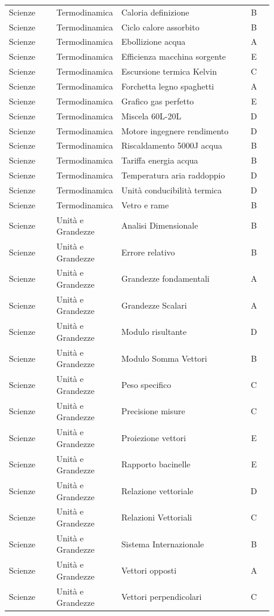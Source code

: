 \documentclass[20pt, a4paper]{article}
\begin{document}
\begin{longtable}{@{}>{\raggedright\arraybackslash}p{0.18\linewidth}>{\raggedright\arraybackslash}p{0.24\linewidth}>{\raggedright\arraybackslash}p{0.46\linewidth}c@{}}
Scienze & Termodinamica & Caloria definizione & B \\
Scienze & Termodinamica & Ciclo calore assorbito & B \\
Scienze & Termodinamica & Ebollizione acqua & A \\
Scienze & Termodinamica & Efficienza macchina sorgente & E \\
Scienze & Termodinamica & Escursione termica Kelvin & C \\
Scienze & Termodinamica & Forchetta legno spaghetti & A \\
Scienze & Termodinamica & Grafico gas perfetto & E \\
Scienze & Termodinamica & Miscela 60L-20L & D \\
Scienze & Termodinamica & Motore ingegnere rendimento & D \\
Scienze & Termodinamica & Riscaldamento 5000J acqua & B \\
Scienze & Termodinamica & Tariffa energia acqua & B \\
Scienze & Termodinamica & Temperatura aria raddoppio & D \\
Scienze & Termodinamica & Unità conducibilità termica & D \\
Scienze & Termodinamica & Vetro e rame & B \\
Scienze & Unità e Grandezze & Analisi Dimensionale & B \\
Scienze & Unità e Grandezze & Errore relativo & B \\
Scienze & Unità e Grandezze & Grandezze fondamentali & A \\
Scienze & Unità e Grandezze & Grandezze Scalari & A \\
Scienze & Unità e Grandezze & Modulo risultante & D \\
Scienze & Unità e Grandezze & Modulo Somma Vettori & B \\
Scienze & Unità e Grandezze & Peso specifico & C \\
Scienze & Unità e Grandezze & Precisione misure & C \\
Scienze & Unità e Grandezze & Proiezione vettori & E \\
Scienze & Unità e Grandezze & Rapporto bacinelle & E \\
Scienze & Unità e Grandezze & Relazione vettoriale & D \\
Scienze & Unità e Grandezze & Relazioni Vettoriali & C \\
Scienze & Unità e Grandezze & Sistema Internazionale & B \\
Scienze & Unità e Grandezze & Vettori opposti & A \\
Scienze & Unità e Grandezze & Vettori perpendicolari & C
\end{longtable}
\end{document}
